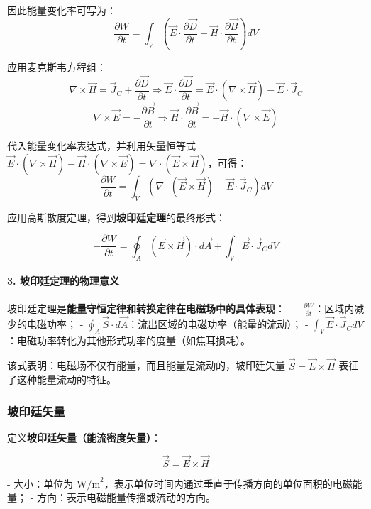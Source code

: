 因此能量变化率可写为：
\[
\frac{\partial W}{\partial t} = \int_{V} \left( \vec{E} \cdot \frac{\partial \vec{D}}{\partial t} + \vec{H} \cdot \frac{\partial \vec{B}}{\partial t} \right) dV
\]

应用麦克斯韦方程组：
\[
\nabla \times \vec{H} = \vec{J}_C + \frac{\partial \vec{D}}{\partial t} \Rightarrow \vec{E} \cdot \frac{\partial \vec{D}}{\partial t} = \vec{E} \cdot (\nabla \times \vec{H}) - \vec{E} \cdot \vec{J}_C
\]
\[
\nabla \times \vec{E} = -\frac{\partial \vec{B}}{\partial t} \Rightarrow \vec{H} \cdot \frac{\partial \vec{B}}{\partial t} = -\vec{H} \cdot (\nabla \times \vec{E})
\]

代入能量变化率表达式，并利用矢量恒等式 $\vec{E} \cdot (\nabla \times \vec{H}) - \vec{H} \cdot (\nabla \times \vec{E}) = \nabla \cdot (\vec{E} \times \vec{H})$，可得：
\[
\frac{\partial W}{\partial t} = \int_{V} \left( \nabla \cdot (\vec{E} \times \vec{H}) - \vec{E} \cdot \vec{J}_C \right) dV
\]

应用高斯散度定理，得到\textbf{坡印廷定理}的最终形式：
\begin{formulaBox}
\[
-\frac{\partial W}{\partial t} = \oint_{A} (\vec{E} \times \vec{H}) \cdot d\vec{A} + \int_{V} \vec{E} \cdot \vec{J}_C dV
\]
\end{formulaBox}

\paragraph{3. 坡印廷定理的物理意义}
坡印廷定理是\textbf{能量守恒定律和转换定律在电磁场中的具体表现}：
- $-\frac{\partial W}{\partial t}$：区域内减少的电磁功率；
- $\oint_{A} \vec{S} \cdot d\vec{A}$：流出区域的电磁功率（能量的流动）；
- $\int_{V} \vec{E} \cdot \vec{J}_C dV$：电磁功率转化为其他形式功率的度量（如焦耳损耗）。

该式表明：电磁场不仅有能量，而且能量是流动的，坡印廷矢量 $\vec{S} = \vec{E} \times \vec{H}$ 表征了这种能量流动的特征。

\subsubsection{坡印廷矢量}
定义\textbf{坡印廷矢量（能流密度矢量）}：
\begin{formulaBox}
\[
\vec{S} = \vec{E} \times \vec{H}
\]
\end{formulaBox}

- 大小：单位为 $\text{W/m}^2$，表示单位时间内通过垂直于传播方向的单位面积的电磁能量；
- 方向：表示电磁能量传播或流动的方向。


